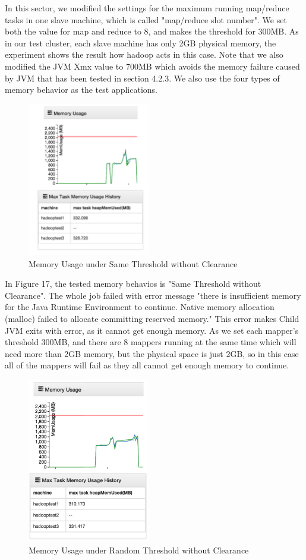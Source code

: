 In this sector, we modified the settings for the maximum running map/reduce tasks in one slave machine, which is called "map/reduce slot number". We set both the value for map and reduce to 8, and makes the threshold for 300MB. As in our test cluster, each slave machine has only 2GB physical memory, the experiment shows the result how hadoop acts in this case. Note that we also modified the JVM Xmx value to 700MB which avoids the memory failure caused by JVM that has been tested in section 4.2.3. We also use the four types of memory behavior as the test applications. 

\begin{figure}[ht]
  \centering
    \includegraphics[width=2.1in]{image/test3a.png}
    \caption{Memory Usage under Same Threshold without Clearance}
    \label{ref:test3a}
\end{figure}

In Figure 17, the tested memory behavios is "Same Threshold without Clearance". The whole job failed with error message "there is insufficient memory for the Java Runtime Environment to continue. Native memory allocation (malloc) failed to allocate committing reserved memory." This error makes Child JVM exits with error, as it cannot get enough memory. As we set each mapper's threshold 300MB, and there are 8 mappers running at the same time which will need more than 2GB memory, but the physical space is just 2GB, so in this case all of the mappers will fail as they all cannot get enough memory to continue.

\begin{figure}[ht]
  \centering
    \includegraphics[width=2.1in]{image/test3b.png}
    \caption{Memory Usage under Random Threshold without Clearance}
    \label{ref:test3b}
\end{figure}

